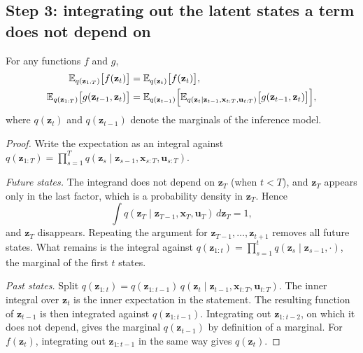 \subsection*{Step 3: integrating out the latent states a term does not
depend on}

\begin{proposition}\label{prop:marginalise}
For any functions $f$ and $g$,
\begin{align*}
    \mathbb{E}_{q(\mathbf{z}_{1:T})}\big[f(\mathbf{z}_t)\big] &=
    \mathbb{E}_{q(\mathbf{z}_t)}\big[f(\mathbf{z}_t)\big], \\
    \mathbb{E}_{q(\mathbf{z}_{1:T})}\big[g(\mathbf{z}_{t-1}, \mathbf{z}_t)\big] &=
    \mathbb{E}_{q(\mathbf{z}_{t-1})}\Big[\mathbb{E}_{q(\mathbf{z}_t \mid
    \mathbf{z}_{t-1}, \mathbf{x}_{t:T}, \mathbf{u}_{t:T})}\big[
    g(\mathbf{z}_{t-1}, \mathbf{z}_t)\big]\Big],
\end{align*}
where $q(\mathbf{z}_t)$ and $q(\mathbf{z}_{t-1})$ denote the marginals of
the inference model.
\end{proposition}

\begin{proof}
Write the expectation as an integral against
$q(\mathbf{z}_{1:T}) = \prod_{s=1}^T q(\mathbf{z}_s \mid
\mathbf{z}_{s-1}, \mathbf{x}_{s:T}, \mathbf{u}_{s:T})$.

\emph{Future states.} The integrand does not depend on $\mathbf{z}_T$
(when $t < T$), and $\mathbf{z}_T$ appears only in the last factor, which
is a probability density in $\mathbf{z}_T$. Hence
\[
    \int q(\mathbf{z}_T \mid \mathbf{z}_{T-1}, \mathbf{x}_{T},
    \mathbf{u}_{T})\,d\mathbf{z}_T = 1,
\]
and $\mathbf{z}_T$ disappears. Repeating the argument for
$\mathbf{z}_{T-1}, \dots, \mathbf{z}_{t+1}$ removes all future states.
What remains is the integral against
$q(\mathbf{z}_{1:t}) = \prod_{s=1}^{t} q(\mathbf{z}_s \mid
\mathbf{z}_{s-1}, \cdot)$, the marginal of the first $t$ states.

\emph{Past states.} Split $q(\mathbf{z}_{1:t}) =
q(\mathbf{z}_{1:t-1})\, q(\mathbf{z}_t \mid \mathbf{z}_{t-1},
\mathbf{x}_{t:T}, \mathbf{u}_{t:T})$. The inner integral over
$\mathbf{z}_t$ is the inner expectation in the statement. The resulting
function of $\mathbf{z}_{t-1}$ is then integrated against
$q(\mathbf{z}_{1:t-1})$. Integrating out $\mathbf{z}_{1:t-2}$, on which
it does not depend, gives the marginal $q(\mathbf{z}_{t-1})$ by
definition of a marginal. For $f(\mathbf{z}_t)$, integrating out
$\mathbf{z}_{1:t-1}$ in the same way gives $q(\mathbf{z}_t)$.
\end{proof}


